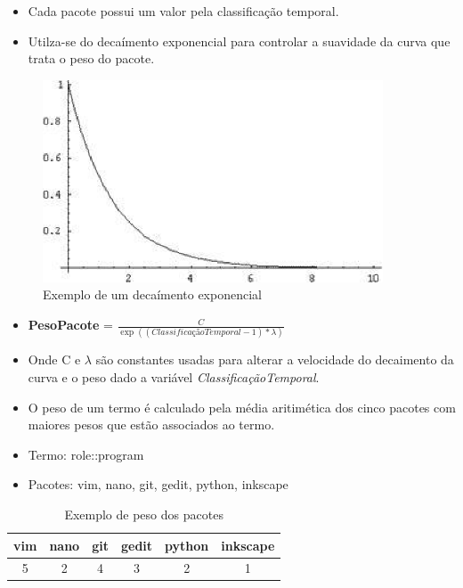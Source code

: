 \begin{frame}
    \begin{itemize}
        \item Cada pacote possui um valor pela classificação temporal.
        \item Utilza-se do decaímento exponencial para controlar a suavidade da
curva que trata o peso do pacote.
    \end{itemize}

    \begin{figure}[h]
      \centering
      \includegraphics[width=0.9\textwidth]{figura/decaimento_exponencial.eps}
      \caption{Exemplo de um decaímento exponencial}
      \label{fig:curva_aprendizado}
    \end{figure}
\end{frame}

\begin{frame}
\begin{itemize}
    \item \textbf{PesoPacote} = $\frac{C}{\exp\left(({ClassificaçãoTemporal - 1}) * {\lambda}\right)}$
    \item Onde C e ${\lambda}$ são constantes usadas para alterar a velocidade do
decaimento da curva e o peso dado a variável \textit{ClassificaçãoTemporal}.
\end{itemize}
\end{frame}

\begin{frame}
    \begin{itemize}
        \item O peso de um termo é calculado pela média aritimética dos cinco
pacotes com maiores pesos que estão associados
ao termo.
        \item Termo: role::program
        \item Pacotes: vim, nano, git, gedit, python, inkscape
    \end{itemize}
    \begin{table}[h]
    \centering
    \begin{tabular}{cccccc}
    \hline
    \rowcolor[HTML]{EFEFEF}
    {vim} & {nano} & {git} & {gedit} & {python} & {inkscape} \\ \hline
    {5} & {2} & {4} & {3} & {2} & {1} \\ \hline
    \end{tabular}
    \caption{Exemplo de peso dos pacotes}
    \label{tab:classificacao_pacotes}
    \end{table}
\end{frame}

